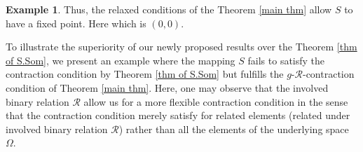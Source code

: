 \documentclass[10pt, reqno]{amsart}
\theoremstyle{definition}
\newtheorem{example}[theorem]{Example}
\theoremstyle{remark}
\numberwithin{equation}{section}
\begin{document}
\begin{example}
	 Thus, the  relaxed conditions of the  Theorem  \ref{main thm} allow $ S $ to have a fixed point. Here which is $ ( 0, 0) $. 
\end{example}


%
%
%

To illustrate the superiority of our newly proposed results over the Theorem \ref{thm of S.Som}, we present an example where the mapping 
$S$ fails to satisfy the contraction condition   by Theorem \ref{thm of S.Som} but fulfills the $g$-$\mathcal{R}$-contraction condition of Theorem \ref{main thm}. Here, one may observe that  the involved binary relation $\mathcal{R}$ allow us for a more flexible contraction condition in the sense that the contraction condition merely satisfy for related elements (related under involved binary relation $\mathcal{R}$) rather than all the elements of the underlying space $\Omega$.   

%
%
\end{document}
